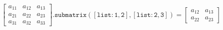 \documentclass[preview]{standalone}
\begin{document}
\[ 
 \left[\begin{matrix} 
         a_{11} & a_{12} & a_{13} \\ 
         a_{21} & a_{22} & a_{23} \\ 
         a_{31} & a_{32} & a_{33} 
         \end{matrix}\right]\mathtt{.submatrix([list: 1, 2], [list: 2, 3])} 
    = 
 \left[\begin{matrix} 
         a_{12} & a_{13} \\ 
         a_{22} & a_{23}\end{matrix}\right] 
 \] 
\end{document}
